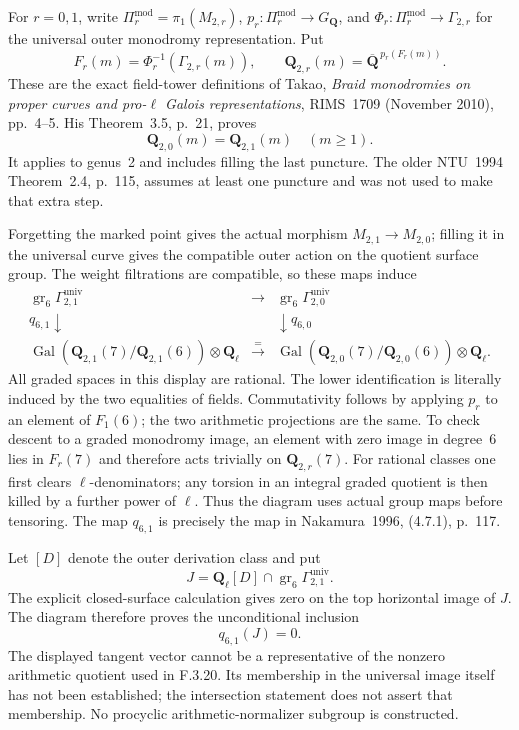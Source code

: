 For $r=0,1$, write $\Pi_r^{\mathrm{mod}}=\pi_1(M_{2,r})$,
$p_r:\Pi_r^{\mathrm{mod}}\to G_{\mathbf Q}$, and
$\Phi_r:\Pi_r^{\mathrm{mod}}\to\Gamma_{2,r}$ for the
universal outer monodromy representation. Put
\[
 F_r(m)=\Phi_r^{-1}(\Gamma_{2,r}(m)),\qquad
 \mathbf Q_{2,r}(m)=\overline{\mathbf Q}^{\,p_r(F_r(m))}.
\]
These are the exact field-tower definitions of Takao,
\emph{Braid monodromies on proper curves and pro-$\ell$
Galois representations}, RIMS~1709 (November 2010), pp.~4--5.
His Theorem~3.5, p.~21, proves
\[
 \mathbf Q_{2,0}(m)=\mathbf Q_{2,1}(m)\quad(m\ge1).
\]
It applies to genus~2 and includes filling the last puncture.
The older NTU~1994 Theorem~2.4, p.~115, assumes at least one
puncture and was not used to make that extra step.

Forgetting the marked point gives the actual morphism
$M_{2,1}\to M_{2,0}$; filling it in the universal curve gives
the compatible outer action on the quotient surface group.
The weight filtrations are compatible, so these maps induce
\[
\begin{array}{ccc}
 \operatorname{gr}_6\Gamma^{\mathrm{univ}}_{2,1}
 &\longrightarrow&
 \operatorname{gr}_6\Gamma^{\mathrm{univ}}_{2,0}\\
 q_{6,1}\downarrow&&\downarrow q_{6,0}\\
 \operatorname{Gal}(\mathbf Q_{2,1}(7)/\mathbf Q_{2,1}(6))
       \otimes\mathbf Q_\ell
 &\xrightarrow{\ =\ }&
 \operatorname{Gal}(\mathbf Q_{2,0}(7)/\mathbf Q_{2,0}(6))
       \otimes\mathbf Q_\ell.
\end{array}
\]
All graded spaces in this display are rational. The lower
identification is literally induced by the two equalities of
fields. Commutativity follows by applying $p_r$ to an element
of $F_1(6)$; the two arithmetic projections are the same.
To check descent to a graded monodromy image, an element with
zero image in degree~6 lies in $F_r(7)$ and therefore acts
trivially on $\mathbf Q_{2,r}(7)$. For rational classes one
first clears $\ell$-denominators; any torsion in an integral
graded quotient is then killed by a further power of $\ell$.
Thus the diagram uses actual group maps before tensoring.
The map $q_{6,1}$ is precisely the map in Nakamura~1996,
(4.7.1), p.~117.

Let $[D]$ denote the outer derivation class and put
\[
 J=\mathbf Q_\ell[D]\cap
     \operatorname{gr}_6\Gamma^{\mathrm{univ}}_{2,1}.
\]
The explicit closed-surface calculation gives zero on the
top horizontal image of $J$. The diagram therefore proves
the unconditional inclusion
\[
 \boxed{\ q_{6,1}(J)=0.\ }
\]
The displayed tangent vector cannot be a representative of
the nonzero arithmetic quotient used in F.3.20. Its membership
in the universal image itself has not been established; the
intersection statement does not assert that membership.
No procyclic arithmetic-normalizer subgroup is constructed.

